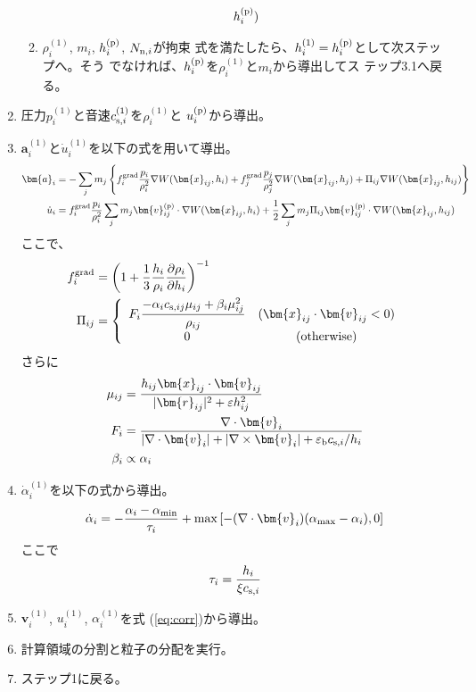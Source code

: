 \begin{enumerate}
\begin{enumerate}
\begin{align}
      h_i^{({\rm p})})
    \end{align}
  \item $\rho_i^{(1)}$, $m_i$, $h_i^{({\rm p})}$, $N_{{\rm n},i}$が拘束
    式を満たしたら、$h_i^{(1)}=h_i^{({\rm p})}$として次ステップへ。そう
    でなければ、$h_i^{({\rm p})}$を$\rho_i^{(1)}$と$m_i$から導出してス
    テップ3.1へ戻る。
  \end{enumerate}
\item 圧力$p_i^{(1)}$と音速$c_{{\rm s},i}^{(1)}$を$\rho_i^{(1)}$と
  $u_i^{({\rm p})}$から導出。
\item $\bm{a}_i^{(1)}$と$\dot{u}_i^{(1)}$を以下の式を用いて導出。
  \begin{align}
    \bm{a}_i &= - \sum_j m_j \left\{ f_i^{\rm grad}
    \frac{p_i}{\rho_i^2} \nabla W(\bm{x}_{ij},h_i) + f_j^{\rm grad}
    \frac{p_j}{\rho_j^2} \nabla W(\bm{x}_{ij},h_j) + \Pi_{ij} \nabla
    W(\bm{x}_{ij},h_{ij}) \right\} \\ \dot{u}_i &= f_i^{\rm grad}
    \frac{p_i}{ \rho_i^2} \sum_j m_j \bm{v}_{ij}^{({\rm p})} \cdot
    \nabla W(\bm{x}_{ij},h_i) + \frac{1}{2} \sum_j m_j \Pi_{ij}
    \bm{v}_{ij}^{({\rm p})} \cdot \nabla W(\bm{x}_{ij},h_{ij})
  \end{align}
  ここで、
  \begin{align}
    f_i^{\rm grad} &= \left( 1 + \frac{1}{3} \frac{h_i}{\rho_i}
    \frac{\partial \rho_i}{\partial h_i} \right)^{-1} \\
    \Pi_{ij} &= \left\{
    \begin{array}{cc}
      \displaystyle F_i \frac{-\alpha_i c_{{\rm s},ij} \mu_{ij} +
        \beta_i \mu_{ij}^2}{\rho_{ij}} & (\bm{x}_{ij} \cdot
      \bm{v}_{ij} < 0) \\ 0 & (\mbox{otherwise})
    \end{array}
    \right. \\
  \end{align}
  さらに
  \begin{align}
    \mu_{ij} &= \frac{h_{ij} \bm{x}_{ij} \cdot
      \bm{v}_{ij}}{|\bm{r}_{ij}|^2+\varepsilon h_{ij}^2} \\ F_i &=
    \frac{\nabla \cdot \bm{v}_i}{|\nabla \cdot \bm{v}_i| + |\nabla
      \times \bm{v}_i| + \varepsilon_{\rm b} c_{{\rm s}, i}/h_i} \\
    \beta_i &\propto \alpha_i
  \end{align}
\item $\dot{\alpha}_i^{(1)}$を以下の式から導出。
  \begin{align}
    \dot{\alpha}_i = - \frac{\alpha_i - \alpha_{\rm min}}{\tau_i} +
    \max \left[ -(\nabla \cdot \bm{v}_i) (\alpha_{\rm max} -
      \alpha_i), 0 \right] \label{eq:alphai}
  \end{align}
  ここで
  \begin{align}
    \tau_i = \frac{h_i}{\xi c_{{\rm s},i}}
  \end{align}
\item $\bm{v}_i^{(1)}$, $u_i^{(1)}$, $\alpha_i^{(1)}$を式
  (\ref{eq:corr})から導出。
\item 計算領域の分割と粒子の分配を実行。
\item ステップ1に戻る。
\end{enumerate}

